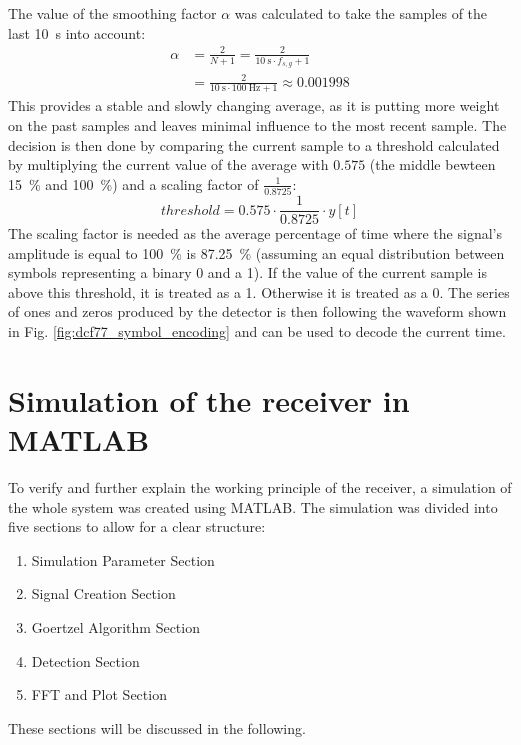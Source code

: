 \documentclass[conference]{IEEEtran}
\begin{document}
\FloatBarrier\noindent
The value of the smoothing factor $\alpha$ was calculated to take the samples of the last \SI{10}{\second} into account:
\begin{equation}
    \begin{split}
        \alpha &= \frac{2}{N + 1} = \frac{2}{\SI{10}{\second} \cdot f_{s,g} + 1}\\
        &= \frac{2}{\SI{10}{\second} \cdot \SI{100}{\hertz} + 1} \approx 0.001998
    \end{split}
    \label{eqn:ema-alpha}
\end{equation}
This provides a stable and slowly changing average, as it is putting more weight on the past samples and leaves minimal influence to the most recent sample.
The decision is then done by comparing the current sample to a threshold calculated by multiplying the current value of the average with $0.575$ (the middle bewteen \SI{15}{\percent} and \SI{100}{\percent}) and a scaling factor of $\frac{1}{0.8725}$:
\begin{equation}
    threshold = 0.575 \cdot \frac{1}{0.8725} \cdot y[t]
    \label{eqn:thresh}
\end{equation}
The scaling factor is needed as the average percentage of time where the signal's amplitude is equal to \SI{100}{\percent} is \SI{87.25}{\percent} (assuming an equal distribution between symbols representing a binary 0 and a 1).
If the value of the current sample is above this threshold, it is treated as a 1.
Otherwise it is treated as a 0.
The series of ones and zeros produced by the detector is then following the waveform shown in Fig. \ref{fig:dcf77_symbol_encoding} and can be used to decode the current time. 

\section{Simulation of the receiver in MATLAB}
To verify and further explain the working principle of the receiver, a simulation of the whole system was created using MATLAB.
The simulation was divided into five sections to allow for a clear structure:
\begin{enumerate}
    \item Simulation Parameter Section
    \item Signal Creation Section
    \item Goertzel Algorithm Section
    \item Detection Section
    \item FFT and Plot Section
\end{enumerate}
These sections will be discussed in the following.
\end{document}
